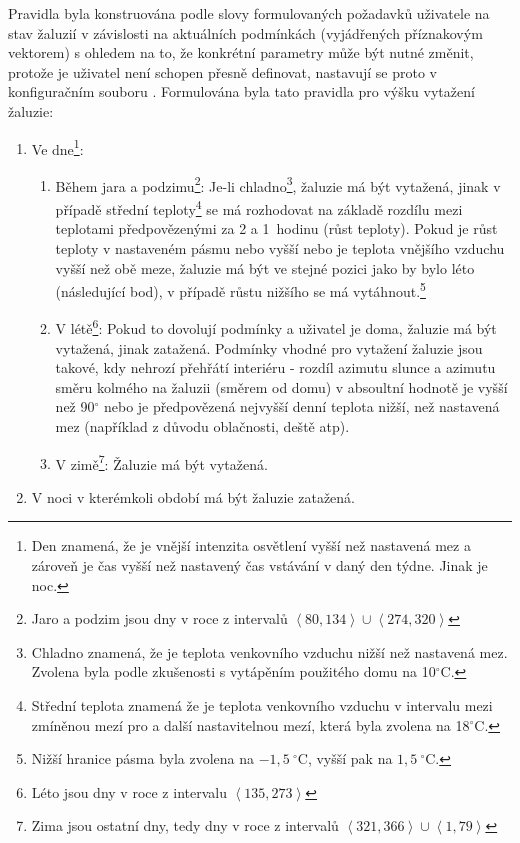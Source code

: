         Pravidla byla konstruována podle slovy formulovaných požadavků uživatele na stav žaluzií v závislosti na aktuálních podmínkách (vyjádřených příznakovým vektorem) s ohledem na to, že konkrétní parametry může být nutné změnit, protože je uživatel není schopen přesně definovat, nastavují se proto v konfiguračním souboru . Formulována byla tato pravidla pro výšku vytažení žaluzie:
        \begin{enumerate}
            \item Ve dne\footnote{Den znamená, že je vnější intenzita osvětlení vyšší než nastavená mez a zároveň je čas vyšší než nastavený čas vstávání v daný den týdne. Jinak je noc.}:
            \begin{enumerate}
                \item Během jara a podzimu\footnote{Jaro a podzim jsou dny v roce z intervalů $\left\langle 80, 134\right\rangle \cup  \left\langle 274, 320\right\rangle $}: Je-li chladno\footnote{Chladno znamená, že je teplota venkovního vzduchu nižší než nastavená mez. Zvolena byla podle zkušenosti s vytápěním použitého domu na 10$^\circ$C.}, žaluzie má být vytažená, jinak v případě střední teploty\footnote{Střední teplota znamená že je teplota venkovního vzduchu v intervalu mezi zmíněnou mezí pro  a další nastavitelnou mezí, která byla zvolena na 18$^\circ$C.} se má rozhodovat na základě rozdílu mezi teplotami předpovězenými za 2 a 1~hodinu (růst teploty). Pokud je růst teploty v nastaveném pásmu nebo vyšší nebo je teplota vnějšího vzduchu vyšší než obě meze, žaluzie má být ve stejné pozici jako by bylo léto (následující bod), v případě růstu nižšího se má vytáhnout.\footnote{Nižší hranice pásma byla zvolena na $-1{,}5~^\circ \mathrm{C}$, vyšší pak na $1{,}5~^\circ \mathrm{C}$.}
                \item V létě\footnote{Léto jsou dny v roce z intervalu $\left\langle 135, 273\right\rangle$}: Pokud to dovolují podmínky a uživatel je doma, žaluzie má být vytažená, jinak zatažená. Podmínky vhodné pro vytažení žaluzie jsou takové, kdy nehrozí přehřátí interiéru - rozdíl azimutu slunce a azimutu směru kolmého na žaluzii (směrem od domu) v absoultní hodnotě je vyšší než 90$^\circ$ nebo je předpovězená nejvyšší denní teplota nižší, než nastavená mez (například z důvodu oblačnosti, deště \acrshort{atp}).
                \item V zimě\footnote{Zima jsou ostatní dny, tedy dny v roce z intervalů $\left\langle 321, 366\right\rangle \cup \left\langle 1, 79\right\rangle $}: Žaluzie má být vytažená.
            \end{enumerate}
            \item V noci v kterémkoli období má být žaluzie zatažená.
        \end{enumerate}
